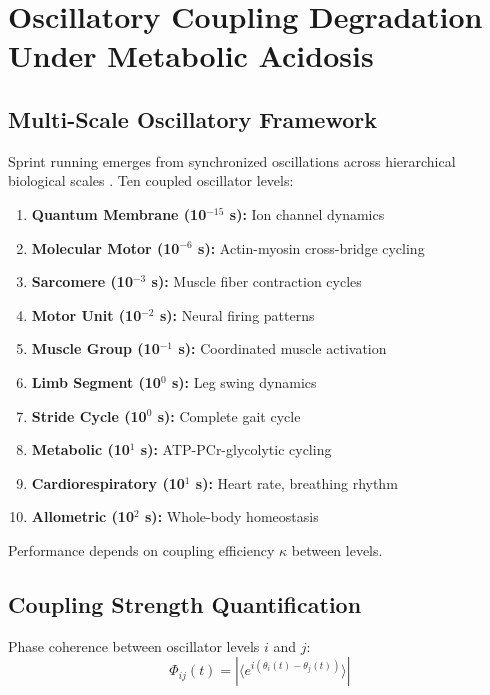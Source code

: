 \section{Oscillatory Coupling Degradation Under Metabolic Acidosis}

\subsection{Multi-Scale Oscillatory Framework}

Sprint running emerges from synchronized oscillations across hierarchical biological scales \citep{AuthorYear}. Ten coupled oscillator levels:

\begin{enumerate}
    \item \textbf{Quantum Membrane (10$^{-15}$ s):} Ion channel dynamics
    \item \textbf{Molecular Motor (10$^{-6}$ s):} Actin-myosin cross-bridge cycling
    \item \textbf{Sarcomere (10$^{-3}$ s):} Muscle fiber contraction cycles
    \item \textbf{Motor Unit (10$^{-2}$ s):} Neural firing patterns
    \item \textbf{Muscle Group (10$^{-1}$ s):} Coordinated muscle activation
    \item \textbf{Limb Segment (10$^{0}$ s):} Leg swing dynamics
    \item \textbf{Stride Cycle (10$^{0}$ s):} Complete gait cycle
    \item \textbf{Metabolic (10$^{1}$ s):} ATP-PCr-glycolytic cycling
    \item \textbf{Cardiorespiratory (10$^{1}$ s):} Heart rate, breathing rhythm
    \item \textbf{Allometric (10$^{2}$ s):} Whole-body homeostasis
\end{enumerate}

Performance depends on coupling efficiency $\kappa$ between levels.

\subsection{Coupling Strength Quantification}

Phase coherence between oscillator levels $i$ and $j$:
\begin{equation}
\Phi_{ij}(t) = |\langle e^{i(\theta_i(t) - \theta_j(t))} \rangle|
\end{equation}

